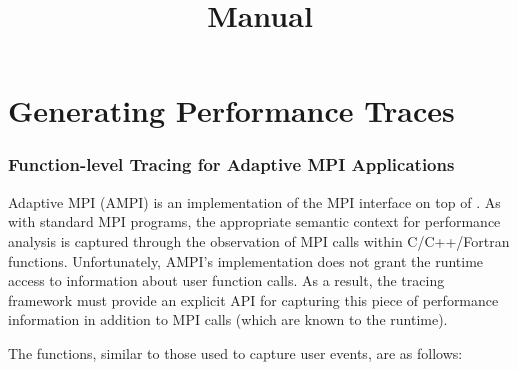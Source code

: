 \documentclass[10pt]{report}
\title{\projections{} Manual}
\begin{document}
\maketitle

\chapter{Generating Performance Traces}



\subsection{Function-level Tracing for Adaptive MPI Applications}
\label{sec::AMPI functions}

Adaptive MPI (AMPI) is an implementation of the MPI interface on top
of \charmpp{}. As with standard MPI programs, the appropriate semantic
context for performance analysis is captured through the observation
of MPI calls within C/C++/Fortran functions. Unfortunately, AMPI's
implementation does not grant the runtime access to information about
user function calls. As a result, the tracing framework must provide
an explicit API for capturing this piece of performance information in
addition to MPI calls (which are known to the runtime).

The functions, similar to those used to capture user events, are as
follows:
\end{document}
